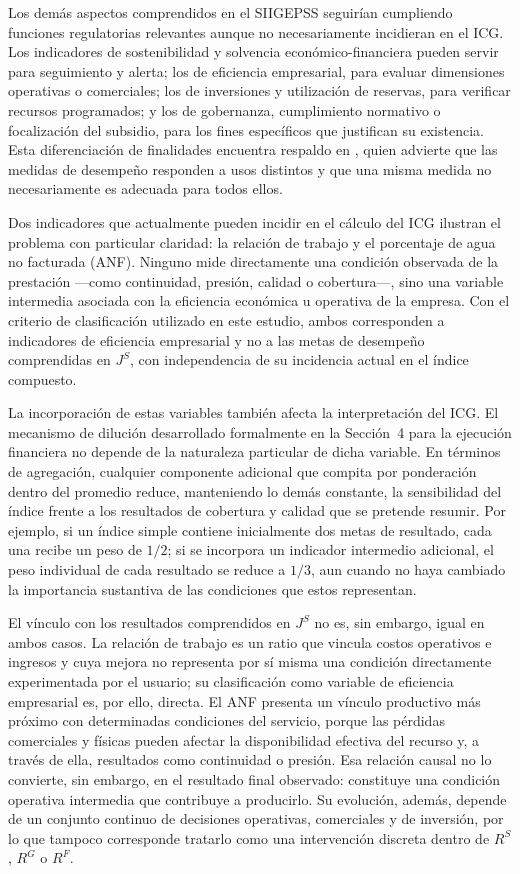 Los demás aspectos comprendidos en el SIIGEPSS seguirían cumpliendo funciones regulatorias relevantes aunque no necesariamente incidieran en el ICG. Los indicadores de sostenibilidad y solvencia económico-financiera pueden servir para seguimiento y alerta; los de eficiencia empresarial, para evaluar dimensiones operativas o comerciales; los de inversiones y utilización de reservas, para verificar recursos programados; y los de gobernanza, cumplimiento normativo o focalización del subsidio, para los fines específicos que justifican su existencia. Esta diferenciación de finalidades encuentra respaldo en \citet{behn2003measure}, quien advierte que las medidas de desempeño responden a usos distintos y que una misma medida no necesariamente es adecuada para todos ellos.

Dos indicadores que actualmente pueden incidir en el cálculo del ICG ilustran el problema con particular claridad: la relación de trabajo y el porcentaje de agua no facturada (ANF). Ninguno mide directamente una condición observada de la prestación ---como continuidad, presión, calidad o cobertura---, sino una variable intermedia asociada con la eficiencia económica u operativa de la empresa. Con el criterio de clasificación utilizado en este estudio, ambos corresponden a indicadores de eficiencia empresarial y no a las metas de desempeño comprendidas en \(J^{S}\), con independencia de su incidencia actual en el índice compuesto.

La incorporación de estas variables también afecta la interpretación del ICG. El mecanismo de dilución desarrollado formalmente en la Sección~4 para la ejecución financiera no depende de la naturaleza particular de dicha variable. En términos de agregación, cualquier componente adicional que compita por ponderación dentro del promedio reduce, manteniendo lo demás constante, la sensibilidad del índice frente a los resultados de cobertura y calidad que se pretende resumir. Por ejemplo, si un índice simple contiene inicialmente dos metas de resultado, cada una recibe un peso de \(1/2\); si se incorpora un indicador intermedio adicional, el peso individual de cada resultado se reduce a \(1/3\), aun cuando no haya cambiado la importancia sustantiva de las condiciones que estos representan.

El vínculo con los resultados comprendidos en \(J^{S}\) no es, sin embargo, igual en ambos casos. La relación de trabajo es un ratio que vincula costos operativos e ingresos y cuya mejora no representa por sí misma una condición directamente experimentada por el usuario; su clasificación como variable de eficiencia empresarial es, por ello, directa. El ANF presenta un vínculo productivo más próximo con determinadas condiciones del servicio, porque las pérdidas comerciales y físicas pueden afectar la disponibilidad efectiva del recurso y, a través de ella, resultados como continuidad o presión. Esa relación causal no lo convierte, sin embargo, en el resultado final observado: constituye una condición operativa intermedia que contribuye a producirlo. Su evolución, además, depende de un conjunto continuo de decisiones operativas, comerciales y de inversión, por lo que tampoco corresponde tratarlo como una intervención discreta dentro de \(R^{S}\), \(R^{G}\) o \(R^{F}\).

